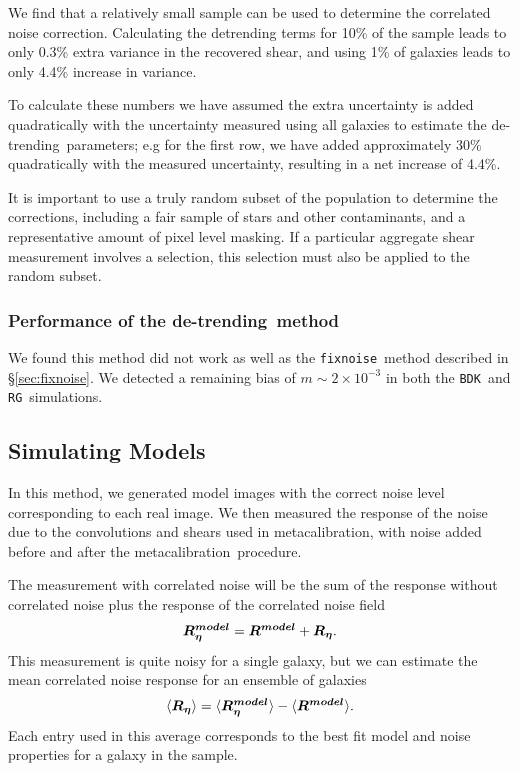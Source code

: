 \documentclass[iop]{emulateapj}
\newcommand{\mcal}{metacalibration}
\newcommand{\mcalRnoise}{\mbox{\boldmath $R_\eta$}}
\newcommand{\mcalRmodel}{\mbox{\boldmath $R^{model}$}}
\newcommand{\mcalRnoisemodel}{\mbox{\boldmath $R^{model}_\eta$}}
\newcommand{\detrend}{de-trending}
\newcommand{\fixnoise}{\texttt{fixnoise}}
\newcommand{\bdsim}{\texttt{BDK}}
\newcommand{\rgsim}{\texttt{RG}}
\begin{document}
We find that a relatively small sample can be used to determine the correlated
noise correction.  Calculating the detrending terms for 10\% of the sample
leads to only 0.3\% extra variance in the recovered shear, and using 1\% of
galaxies leads to only 4.4\% increase in variance.

To calculate these numbers we have assumed the extra uncertainty is added
quadratically with the uncertainty measured using all galaxies to estimate the
\detrend\ parameters; e.g for the first row, we have added approximately 30\%
quadratically with the measured uncertainty, resulting in a net increase of
4.4\%.

It is important to use a truly random subset of the population to determine the
corrections, including a fair sample of stars and other contaminants, and a
representative amount of pixel level masking.  If a particular aggregate shear
measurement involves a selection, this selection must also be applied to the
random subset.

\subsubsection{Performance of the \detrend\ method}

We found this method did not work as well as the \fixnoise\ method
described in \S \ref{sec:fixnoise}.  We detected a remaining bias
of $m \sim 2 \times 10^{-3}$ in both the \bdsim\ and \rgsim\ simulations.

\subsection{Simulating Models}

In this method, we generated model images with the correct noise level corresponding
to each real image.  We then measured the response of the noise due to the
convolutions and shears used in \mcal, with noise added before and
after the \mcal\ procedure.

The measurement with correlated noise will be the sum of the response
without correlated noise plus the response of the correlated noise field
\begin{equation}
    \mcalRnoisemodel = \mcalRmodel + \mcalRnoise.
\end{equation}
This measurement is quite noisy for a single galaxy, but we
can estimate the mean correlated noise response for an ensemble
of galaxies
\begin{equation}
    \langle \mcalRnoise \rangle = \langle \mcalRnoisemodel \rangle - \langle \mcalRmodel \rangle.
\end{equation}
Each entry used in this average corresponds to the best fit model
and noise properties for a galaxy in the sample.
\end{document}
